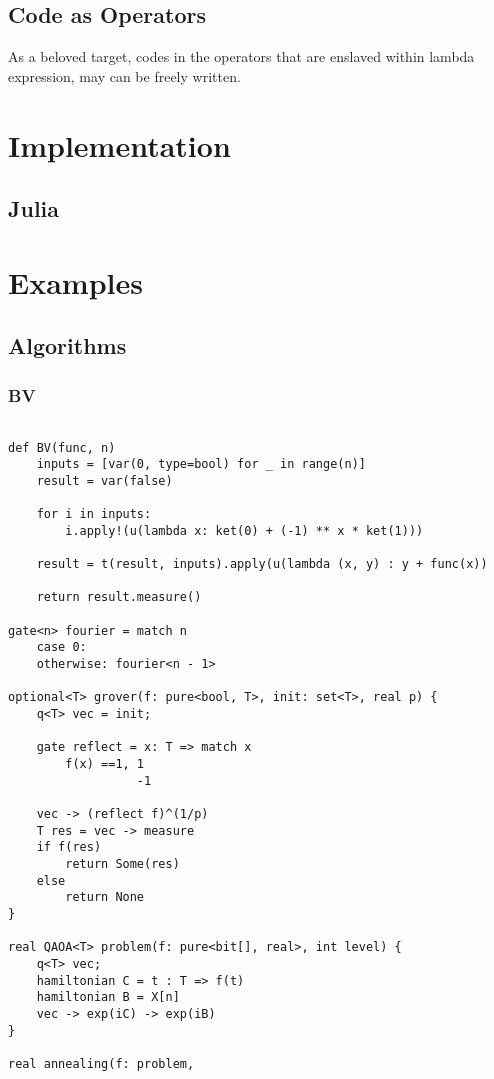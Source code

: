 \documentclass[a4paper,11pt]{article}
\begin{document}
\subsection{Code as Operators}
As a beloved target, codes in the operators that are enslaved within lambda expression, may can be freely written.

\section{Implementation}
\subsection{Julia}
\section{Examples}
\subsection{Algorithms}
\subsubsection{BV}

\begin{lstlisting}

def BV(func, n)
    inputs = [var(0, type=bool) for _ in range(n)]
    result = var(false)
    
    for i in inputs:
        i.apply!(u(lambda x: ket(0) + (-1) ** x * ket(1)))
    
    result = t(result, inputs).apply(u(lambda (x, y) : y + func(x))
    
    return result.measure() 

gate<n> fourier = match n
    case 0:
    otherwise: fourier<n - 1>

optional<T> grover(f: pure<bool, T>, init: set<T>, real p) {
    q<T> vec = init;

    gate reflect = x: T => match x
        f(x) ==1, 1
                  -1

    vec -> (reflect f)^(1/p)
    T res = vec -> measure
    if f(res)
        return Some(res)
    else
        return None
}

real QAOA<T> problem(f: pure<bit[], real>, int level) {
    q<T> vec;
    hamiltonian C = t : T => f(t)
    hamiltonian B = X[n]
    vec -> exp(iC) -> exp(iB)
}

real annealing(f: problem,

\end{lstlisting}
\end{document}
